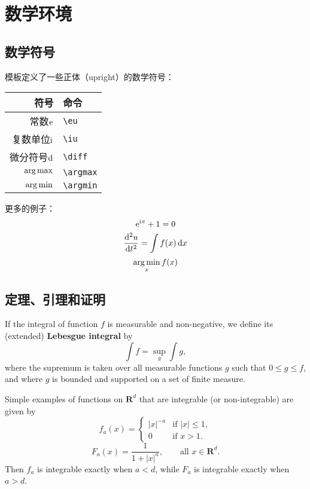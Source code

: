 \section{数学环境}

\subsection{数学符号}

模板定义了一些正体（upright）的数学符号：
\begin{center}
	\begin{tabular}{rl}
		\toprule
		符号                 & 命令 \\
		\midrule
		常数$\mathrm{e}$     & \verb|\eu| \\
		复数单位$\mathrm{i}$ & \verb|\iu| \\
		微分符号$\mathop{}\!\mathrm{d}$ & \verb|\diff| \\
		$\operatorname*{arg\,max}$         & \verb|\argmax| \\
		$\operatorname*{arg\,min}$         & \verb|\argmin| \\
		\bottomrule
	\end{tabular}
\end{center}

更多的例子：
\begin{equation}
\mathrm{e}^{\mathrm{i}\pi} + 1 = 0
\end{equation}
\begin{equation}
\frac{\mathop{}\!\mathrm{d}^2u}{\mathop{}\!\mathrm{d} t^2} = \int f(x) \mathop{}\!\mathrm{d} x
\end{equation}
\begin{equation}
\operatorname*{arg\,min}_x f(x)
\end{equation}

\subsection{定理、引理和证明}

\begin{definition}
	If the integral of function $f$ is measurable and non-negative, we define
	its (extended) \textbf{Lebesgue integral} by
	\begin{equation}
	\int f = \sup_g \int g,
	\end{equation}
	where the supremum is taken over all measurable functions $g$ such that
	$0 \leq g \leq f$, and where $g$ is bounded and supported on a set of
	finite measure.
\end{definition}

\begin{example}
	Simple examples of functions on $\mathbf{R}^d$ that are integrable
	(or non-integrable) are given by
	\begin{equation}
	f_a(x) =
	\begin{cases}
	|x|^{-a} & \text{if } |x| \leq 1,\\
	0 & \text{if } x > 1.
	\end{cases}
	\end{equation}
	\begin{equation}
	F_a(x) = \frac{1}{1 + |x|^a}, \qquad \text{all } x \in \mathbf{R}^d.
	\end{equation}
	Then $f_a$ is integrable exactly when $a < d$, while $F_a$ is integrable
	exactly when $a > d$.
\end{example}

